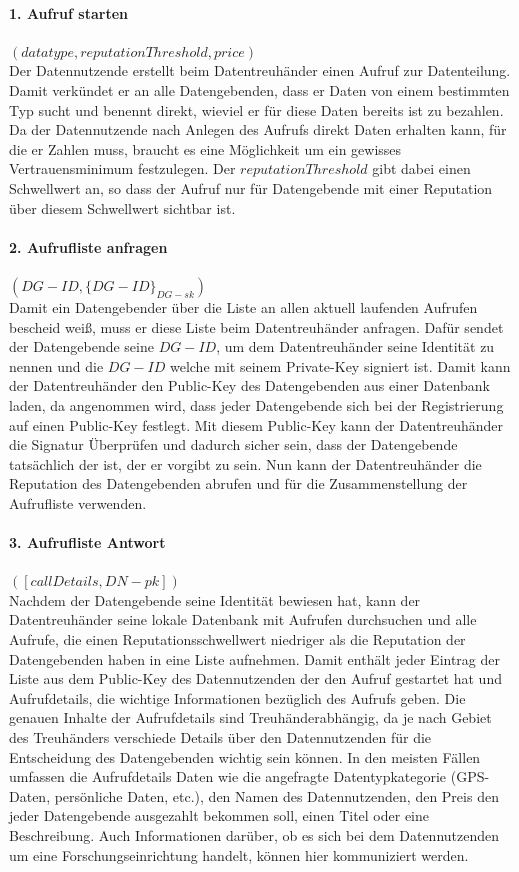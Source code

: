 \documentclass[
	fontsize=12pt,
	headings=small,
	parskip=half,           %
	bibliography=totoc,
	numbers=noenddot,       %
	open=any,               %
]{scrreprt}
\begin{document}
\paragraph{1. Aufruf starten} $(datatype, reputationThreshold, price)$\\
Der Datennutzende erstellt beim Datentreuhänder einen Aufruf zur Datenteilung. Damit verkündet er an alle Datengebenden, dass er Daten von einem bestimmten Typ sucht und benennt direkt, wieviel er für diese Daten bereits ist zu bezahlen. Da der Datennutzende nach Anlegen des Aufrufs direkt Daten erhalten kann, für die er Zahlen muss, braucht es eine Möglichkeit um ein gewisses Vertrauensminimum festzulegen. Der $reputationThreshold$ gibt dabei einen Schwellwert an, so dass der Aufruf nur für Datengebende mit einer Reputation über diesem Schwellwert sichtbar ist.


\paragraph{2. Aufrufliste anfragen} $(DG-ID, {\{DG-ID\}}_{DG-sk})$\\
Damit ein Datengebender über die Liste an allen aktuell laufenden Aufrufen bescheid weiß, muss er diese Liste beim Datentreuhänder anfragen. Dafür sendet der Datengebende seine $DG-ID$, um dem Datentreuhänder seine Identität zu nennen und die $DG-ID$ welche mit seinem Private-Key signiert ist. Damit kann der Datentreuhänder den Public-Key des Datengebenden aus einer Datenbank laden, da angenommen wird, dass jeder Datengebende sich bei der Registrierung auf einen Public-Key festlegt. Mit diesem Public-Key kann der Datentreuhänder die Signatur Überprüfen und dadurch sicher sein, dass der Datengebende tatsächlich der ist, der er vorgibt zu sein. Nun kann der Datentreuhänder die Reputation des Datengebenden abrufen und für die Zusammenstellung der Aufrufliste verwenden.

\paragraph{3. Aufrufliste Antwort} $([callDetails, DN-pk])$\\
Nachdem der Datengebende seine Identität bewiesen hat, kann der Datentreuhänder seine lokale Datenbank mit Aufrufen durchsuchen und alle Aufrufe, die einen Reputationsschwellwert niedriger als die Reputation der Datengebenden haben in eine Liste aufnehmen. Damit enthält jeder Eintrag der Liste aus dem Public-Key des Datennutzenden der den Aufruf gestartet hat und Aufrufdetails, die wichtige Informationen bezüglich des Aufrufs geben. Die genauen Inhalte der Aufrufdetails sind Treuhänderabhängig, da je nach Gebiet des Treuhänders verschiede Details über den Datennutzenden für die Entscheidung des Datengebenden wichtig sein können. In den meisten Fällen umfassen die Aufrufdetails Daten wie die angefragte Datentypkategorie (GPS-Daten, persönliche Daten, etc.), den Namen des Datennutzenden, den Preis den jeder Datengebende ausgezahlt bekommen soll, einen Titel oder eine Beschreibung. Auch Informationen darüber, ob es sich bei dem Datennutzenden um eine Forschungseinrichtung handelt, können hier kommuniziert werden.
\end{document}
